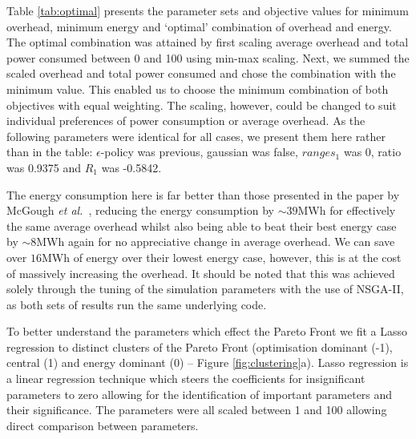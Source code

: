\documentclass[10pt, conference, compsocconf]{IEEEtran}
\begin{document}
Table \ref{tab:optimal} presents the parameter sets and objective values for minimum overhead, minimum energy and `optimal' combination of overhead and energy. The optimal combination was attained by first scaling average overhead and total power consumed between 0 and 100 using min-max scaling. Next, we summed the scaled overhead and total power consumed and chose the combination with the minimum value. This enabled us to choose the minimum combination of both objectives with equal weighting. The scaling, however, could be changed to suit individual preferences of power consumption or average overhead. As the following parameters were identical for all cases, we present them here rather than in the table: $\epsilon$-policy was previous, gaussian was false, $ranges_1$ was 0, ratio was 0.9375 and $R_1$ was -0.5842.

The energy consumption here is far better than those presented in the paper by McGough {\em et al.}~\cite{suscom}, reducing the energy consumption by ${\sim}39$MWh for effectively the same average overhead whilst also being able to beat their best energy case by ${\sim}8$MWh again for no appreciative change in average overhead. We can save over $16$MWh of energy over their lowest energy case, however, this is at the cost of massively increasing the overhead. It should be noted that this was achieved solely through the tuning of the simulation parameters with the use of NSGA-II, as both sets of results run the same underlying code.

To better understand the parameters which effect the Pareto Front we fit a Lasso regression \cite{Tibshirani1996} to distinct clusters of the Pareto Front (optimisation dominant (-1), central (1) and energy dominant (0) -- Figure \ref{fig:clustering}a). Lasso regression is a linear regression technique which steers the coefficients for insignificant parameters to zero allowing for the identification of important parameters and their significance. The parameters were all scaled between 1 and 100 allowing direct comparison between parameters.
\end{document}
